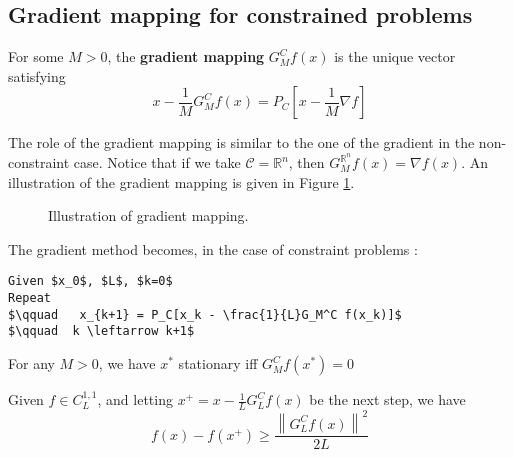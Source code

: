 \subsection{Gradient mapping for constrained problems}

\begin{definition}
For some $M>0$, the \textbf{gradient mapping} $G_M^Cf(x)$ is the unique vector satisfying 
\begin{equation*}
x - \frac{1}{M}G_M^Cf(x) = P_C\left[x - \frac{1}{M}\nabla f\right]
\end{equation*}
\end{definition}

The role of the gradient mapping is similar to the one of the gradient in the non-constraint case. Notice that if we take $\mathcal{C} = \mathbb{R}^n$, then $G_M^{\mathbb{R}^n}f(x) = \nabla f(x)$. An illustration of the gradient mapping is given in Figure \ref{tik2}.

\begin{figure}[H]
\centering
\caption{Illustration of gradient mapping.}
\label {tik2}
\end{figure}

The gradient method becomes, in the case of constraint problems :

\begin{lstlisting}[mathescape,caption=Gradient Method - Constrained Problem]
Given $x_0$, $L$, $k=0$
Repeat
$\qquad   x_{k+1} = P_C[x_k - \frac{1}{L}G_M^C f(x_k)]$
$\qquad  k \leftarrow k+1$
\end{lstlisting}


\begin{property}
For any $M>0$, we have $x^*$ stationary iff $G_M^C f(x^*)=0$
\end{property}

\begin{property}
Given $f \in C^{1,1}_L$, and letting $x^+ = x - \frac{1}{L}G^C_L f(x)$ be the next step, we have
\[
    f(x) - f(x^+) \ge \frac{\left\|G_L^C f(x)\right\|^2}{2L}
\]
\end{property}


